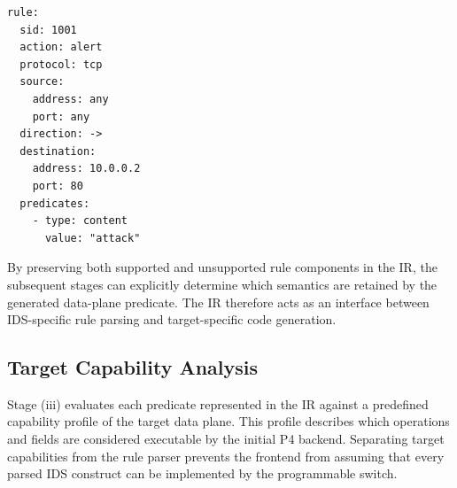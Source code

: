 \documentclass{article}
\begin{document}
\begin{verbatim}
rule:
  sid: 1001
  action: alert
  protocol: tcp
  source:
    address: any
    port: any
  direction: ->
  destination:
    address: 10.0.0.2
    port: 80
  predicates:
    - type: content
      value: "attack"
\end{verbatim}
By preserving both supported and unsupported rule components in the IR,
the subsequent stages can explicitly determine which semantics are
retained by the generated data-plane predicate. The IR therefore acts
as an interface between IDS-specific rule parsing and target-specific
code generation.
\subsection{Target Capability Analysis}
Stage (iii) evaluates each predicate represented in the IR against
a predefined capability profile of the target data plane. This profile
describes which operations and fields are considered executable by the
initial P4 backend. Separating target capabilities from the rule parser
prevents the frontend from assuming that every parsed IDS construct can
be implemented by the programmable switch.
\end{document}
